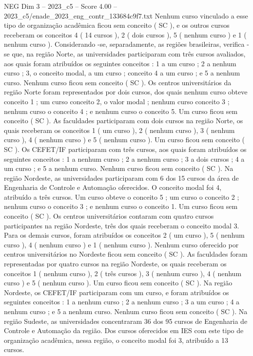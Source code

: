 \begin{textsample}{NEG Dim 3 – 2023\_c5 – Score 4.00 – 2023\_c5/enade\_2023\_eng\_contr\_133684c9f7.txt}
Nenhum curso vinculado a esse tipo de organização acadêmica ficou sem conceito ( SC ), e os outros cursos receberam os conceitos 4 ( 14 cursos ), 2 ( dois cursos ), 5 ( nenhum curso ) e 1 ( nenhum curso ).
Considerando -se, separadamente, as regiões brasileiras, verifica -se que, na região Norte, as universidades participaram com três cursos avaliados, aos quais foram atribuídos os seguintes conceitos : 1 a um curso ; 2 a nenhum curso ; 3, o conceito modal, a um curso ; conceito 4 a um curso ; e 5 a nenhum curso.
Nenhum curso ficou sem conceito ( SC ).
Os centros universitários da região Norte foram representados por dois cursos, dos quais nenhum curso obteve conceito 1 ; um curso conceito 2, o valor modal ; nenhum curso conceito 3 ; nenhum curso o conceito 4 ; e nenhum curso o conceito 5.
Um curso ficou sem conceito ( SC ).
As faculdades participaram com dois cursos na região Norte, os quais receberam os conceitos 1 ( um curso ), 2 ( nenhum curso ), 3 ( nenhum curso ), 4 ( nenhum curso ) e 5 ( nenhum curso ).
Um curso ficou sem conceito ( SC ).
Os CEFET/IF participaram com três cursos, aos quais foram atribuídos os seguintes conceitos : 1 a nenhum curso ; 2 a nenhum curso ; 3 a dois cursos ; 4 a um curso ; e 5 a nenhum curso.
Nenhum curso ficou sem conceito ( SC ).
Na região Nordeste, as universidades participaram com 6 dos 15 cursos da área de Engenharia de Controle e Automação oferecidos.
O conceito modal foi 4, atribuído a três cursos.
Um curso obteve o conceito 5 ; um curso o conceito 2 ; nenhum curso o conceito 3 ; e nenhum curso o conceito 1.
Um curso ficou sem conceito ( SC ).
Os centros universitários contaram com quatro cursos participantes na região Nordeste, três dos quais receberam o conceito modal 3.
Para os demais cursos, foram atribuídos os conceitos 2 ( um curso ), 5 ( nenhum curso ), 4 ( nenhum curso ) e 1 ( nenhum curso ).
Nenhum curso oferecido por centros universitários no Nordeste ficou sem conceito ( SC ).
As faculdades foram representadas por quatro cursos na região Nordeste, os quais receberam os conceitos 1 ( nenhum curso ), 2 ( três cursos ), 3 ( nenhum curso ), 4 ( nenhum curso ) e 5 ( nenhum curso ).
Um curso ficou sem conceito ( SC ).
Na região Nordeste, os CEFET/IF participaram com um curso, e foram atribuídos os seguintes conceitos : 1 a nenhum curso ; 2 a nenhum curso ; 3 a um curso ; 4 a nenhum curso ; e 5 a nenhum curso.
Nenhum curso ficou sem conceito ( SC ).
Na região Sudeste, as universidades concentraram 36 dos 95 cursos de Engenharia de Controle e Automação da região.
Dos cursos oferecidos em IES com este tipo de organização acadêmica, nessa região, o conceito modal foi 3, atribuído a 13 cursos.

\end{textsample}
